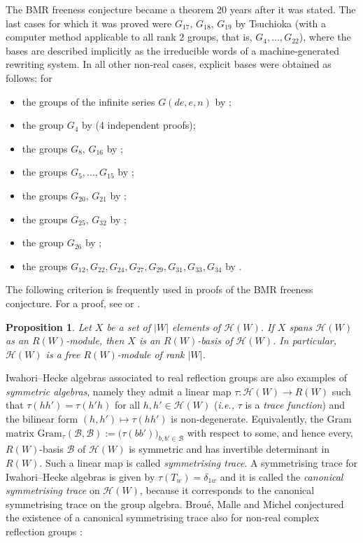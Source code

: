 \documentclass[11pt, reqno]{amsart}
\newcommand{\gram}{\mathrm{Gram}}
\newcommand{\cB}{\mathcal{B}}
\newcommand{\cH}{\mathcal{H}}
\numberwithin{equation}{section}
\newtheorem{proposition}[theorem]{Proposition}
\theoremstyle{remark}
\begin{document}
	The BMR freeness conjecture became a theorem 20 years after it was stated. 
	The last cases for which it was proved were $G_{17},\,G_{18},\,G_{19}$ by Tsuchioka \cite{Tsu} (with a computer method applicable to all rank $2$ groups, that is, $G_4,\ldots,G_{22}$), where the bases are described implicitly as the irreducible words of a
	machine-generated rewriting system.
		In all other non-real cases, explicit bases were obtained as follows: for
	\begin{itemize}
		\item the groups of the infinite series $G(de,e,n)$ by \cite{ArKo, BM, Ar};\smallbreak
		\item the group $G_4$ by \cite{BM, Fun, Mar41, Ch18} (4 independent proofs); \smallbreak
		\item the groups $G_8,\,G_{16}$ by \cite{Ch18}; \smallbreak
		\item the groups $G_5,\ldots, G_{15}$ by \cite{Ch17}; \smallbreak
		\item the groups $G_{20}, \,G_{21}$ by \cite{MarNew};\smallbreak
		\item the groups $G_{25}, \,G_{32}$ by \cite{Mar41};\smallbreak
		\item the group $G_{26}$ by  \cite{Mar43};\smallbreak
		\item the groups $G_{12}, G_{22},G_{24},G_{27}, G_{29}, G_{31}, G_{33}, G_{34}$ by \cite{MaPf}. 	\end{itemize}
	
	
	
	The following criterion is frequently used in proofs of the BMR freeness conjecture. 
		For a proof, see \cite[proof of Theorem 4.24]{BMR} or \cite[Proposition 2.4(1)]{Mar43}. 
		\begin{proposition}\label{span}
			Let $X$ be a set of $|W|$ elements of $\cH(W)$. If $X$ spans $\cH(W)$ as an $R(W)$-module, then $X$ is an $R(W)$-basis of $\cH(W)$. In particular, $\cH(W)$ is a free $R(W)$-module of rank $|W|$.
		\end{proposition}
	
	
	Iwahori--Hecke algebras associated to real reflection groups are also examples of \emph{symmetric algebras}, namely they admit a linear map $\tau:  \cH(W) \rightarrow R(W)$ such that
	$\tau(hh') = \tau(h'h)$ for all $h, h' \in \cH(W)$ (\emph{i.e.,} $\tau$ is a \emph{trace function}) and the bilinear form
	$(h, h') \mapsto \tau(hh')$ is non-degenerate. Equivalently, the Gram matrix $\gram_{\tau}(\cB,\cB):=\bigl(\tau(bb')\bigr)_{b,b'\in\cB}$ with respect to some, and hence every, $R(W)$-basis $\mathcal{B}$ of $\mathcal H(W)$ is symmetric and has invertible determinant in $R(W)$. Such a linear map is called \emph{symmetrising trace}.
	A symmetrising trace for Iwahori--Hecke algebras is given by $\tau(T_w)=\delta_{1w}$  \cite[IV, \S 2]{Bou05} and it is called the \emph{canonical symmetrising trace} on $\cH(W)$, because it corresponds to the canonical symmetrising trace on the group algebra. Brou\'e, Malle and Michel  conjectured the existence of a canonical symmetrising trace also for non-real complex reflection groups \cite[\S2.1, Assumption 2(1)]{BMM}:
	
\end{document}
